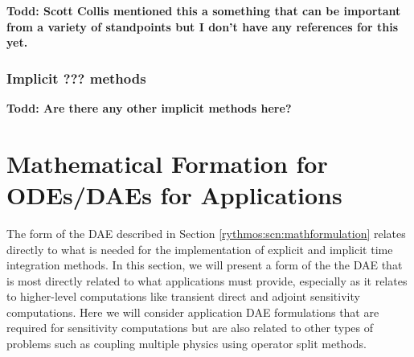 \documentclass[pdf,ps2pdf,11pt]{SANDreport}
\begin{document}
\cite{FETime}
{}\textbf{Todd: Scott Collis mentioned this a something that can be important
from a variety of standpoints but I don't have any references for this yet.}

\subsubsection{Implicit ??? methods}

{}\textbf{Todd: Are there any other implicit methods here?}


\section{Mathematical Formation for ODEs/DAEs for Applications}

The form of the DAE described in Section \ref{rythmos:scn:mathformulation} relates directly to what is
needed for the implementation of explicit and implicit time integration
methods.  In this section, we will present a form of the the DAE that is most
directly related to what applications must provide, especially as it relates
to higher-level computations like transient direct and adjoint sensitivity
computations.  Here we will consider application DAE formulations that are
required for sensitivity computations but are also related to other types of
problems such as coupling multiple physics using operator split methods.
\end{document}
